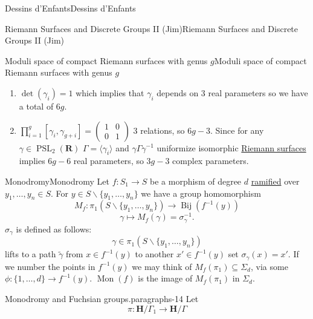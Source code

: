 \documentclass[10pt,]{book}
\numberwithin{equation}{section}
\newcommand{\inv}{^{-1}}
\newcommand{\lb}{[}
\newcommand{\rb}{]}
\newcommand{\RR}{\mathbf{R}}
\newcommand{\HH}{\mathbf{H}}
\DeclareMathOperator{\PSL}{PSL}
\newcommand{\amp}{&}
\begin{document}
\begin{chapterptx}{Dessins d'Enfants}{}{Dessins d'Enfants}{}{}
\begin{sectionptx}{Riemann Surfaces and Discrete Groups II (Jim)}{}{Riemann Surfaces and Discrete Groups II (Jim)}{}{}
\begin{subsectionptx}{Moduli space of compact Riemann surfaces with genus \(g\)}{}{Moduli space of compact Riemann surfaces with genus \(g\)}{}{}
\begin{enumerate}
\item\hypertarget{li-109}{}\(\det(\gamma_i) = 1\) which implies that \(\gamma_i\) depends on 3 real parameters so we have a total of \(6g\).%
\item\hypertarget{li-110}{}\(\prod_{i=1}^g \lb \gamma_i, \gamma_{g+i}\rb = \begin{pmatrix} 1\amp 0 \\ 0\amp 1\end{pmatrix}\) 3 relations, so \(6g- 3\). Since for any \(\gamma \in \PSL_2(\RR)\) \(\Gamma = \langle \gamma_i \rangle\) and \(\gamma\Gamma \gamma\inv\) uniformize isomorphic \hyperref[def-top-riem-surface]{Riemann surfaces} implies \(6g-6\) real parameters, so \(3g-3\) complex parameters.%
\end{enumerate}
%
\end{subsectionptx}
%
%
\typeout{************************************************}
\typeout{************************************************}
%
\begin{subsectionptx}{Monodromy}{}{Monodromy}{}{}\label{subsection-51}
\hypertarget{p-578}{}%
Let \(f\colon S_1 \to S\) be a morphism of degree \(d\) \hyperref[def-dess-ramified]{ramified} over \(y_1,\ldots, y_n \in S\). For \(y\in S\smallsetminus \{y_1,\ldots, y_n\}\) we have a group homomorphism%
\begin{equation*}
M_f\colon \pi_1(S \smallsetminus \{y_1, \ldots, y_n\} )\to \operatorname{Bij} (f\inv (y))
\end{equation*}
%
\begin{equation*}
\gamma \mapsto M_f(\gamma) = \sigma_\gamma\inv\text{.}
\end{equation*}
\(\sigma_\gamma\) is defined as follows:%
\begin{equation*}
\gamma \in \pi_1(S\smallsetminus \{ y_1,\ldots, y_n\})
\end{equation*}
lifts to a path \(\widetilde \gamma\) from \(x\in f\inv(y)\) to another \(x' \in f\inv(y)\) set \(\sigma_\gamma(x) =x'\). If we number the points in \(f\inv (y)\) we may think of \(M_f(\pi_1)\subseteq \Sigma_d\), via some \(\phi\colon \{1,\ldots, d\}\to f\inv (y)\). \(\operatorname{Mon}(f)\) is the image of \(M_f(\pi_1)\) in \(\Sigma_d\).%
\begin{paragraphs}{Monodromy and Fuchsian groups.}{paragraphs-14}%
\hypertarget{p-579}{}%
Let%
\begin{equation*}
\pi \colon \HH/\Gamma_1 \to \HH/ \Gamma
\end{equation*}

\end{paragraphs}
\end{subsectionptx}
\end{sectionptx}
\end{chapterptx}
\end{document}
